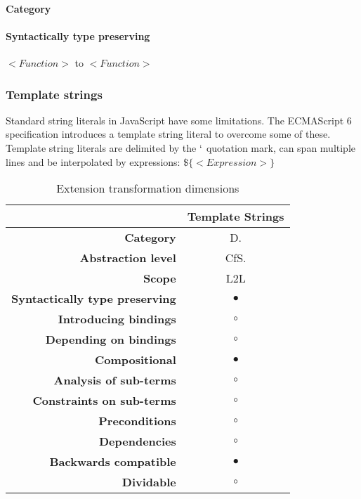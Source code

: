 \paragraph{Category}


\paragraph{Syntactically type preserving}
$<Function>$ to $<Function>$

\subsubsection{Template strings}
Standard string literals in JavaScript have some limitations. The ECMAScript 6 specification introduces a template string literal to overcome some of these\cite[12.2.8]{SpecJS}. Template string literals are delimited by the $`$ quotation mark, can span multiple lines and be interpolated by expressions: $\$\{<Expression>\}$

\begin{table}[h]
\centering
\caption{Extension transformation dimensions}
\label{template-strings-table}
\begin{tabular}{@{}rc@{}}
\toprule
                                       & \multicolumn{1}{l}{\textbf{Template Strings}} \\ \midrule
\textbf{Category}                      & D.
\\
\textbf{Abstraction level}          & CfS.                          \\
\textbf{Scope}                         & L2L                               \\
\textbf{Syntactically type preserving} & $\bullet$                                          \\
\textbf{Introducing bindings}          & $\circ$                                          \\%
\textbf{Depending on bindings}         & $\circ$                                           \\
\textbf{Compositional}                 & $\bullet$                                          \\
\textbf{Analysis of sub-terms}          & $\circ$                                          \\
\textbf{Constraints on sub-terms}       & $\circ$                                           \\
\textbf{Preconditions}                 & $\circ$                                          \\
\textbf{Dependencies}                  & $\circ$                                           \\
\textbf{Backwards compatible}          & $\bullet$                                          \\
\textbf{Dividable}                     & $\circ$                                           \\ \bottomrule
\end{tabular}
\end{table}

